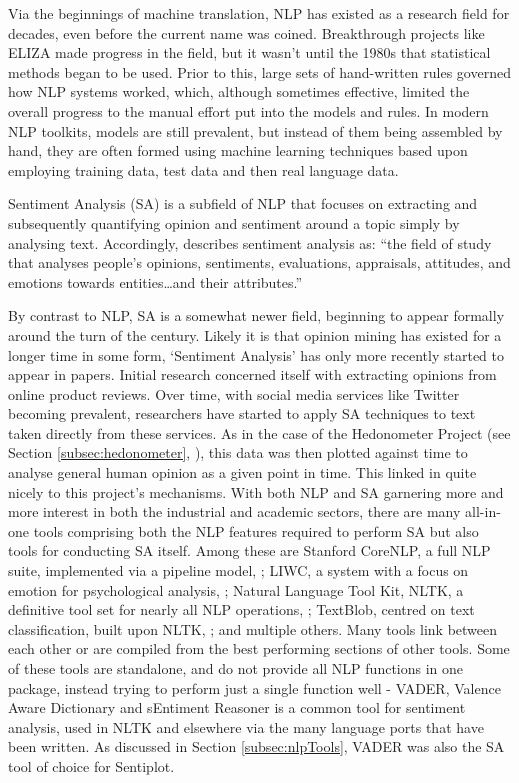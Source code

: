 \documentclass{article}
\begin{document}
{        Via the beginnings of machine translation, NLP has existed as a research field for decades, even before the current name was coined. Breakthrough projects like ELIZA \citep{eliza} made progress in the field, but it wasn't until the 1980s that statistical methods began to be used. Prior to this, large sets of hand-written rules governed how NLP systems worked, which, although sometimes effective, limited the overall progress to the manual effort put into the models and rules. In modern NLP toolkits, models are still prevalent, but instead of them being assembled by hand, they are often formed using machine learning techniques based upon employing training data, test data and then real language data.

        Sentiment Analysis (SA) is a subfield of NLP that focuses on extracting and subsequently quantifying opinion and sentiment around a topic simply by analysing text. Accordingly, \cite{liu2012sentiment} describes sentiment analysis as: ``the field of study that analyses people’s opinions, sentiments, evaluations, appraisals, attitudes, and emotions towards entities\dots and their attributes.''
        
        By contrast to NLP, SA is a somewhat newer field, beginning to appear formally around the turn of the century. Likely it is that opinion mining has existed for a longer time in some form, `Sentiment Analysis' has only more recently started to appear in papers. Initial research concerned itself with extracting opinions from online product reviews. Over time, with social media services like Twitter becoming prevalent, researchers have started to apply SA techniques to text taken directly from these services. As in the case of the Hedonometer Project (see Section \ref{subsec:hedonometer}, \cite{reagan2016emotional}), this data was then plotted against time to analyse general human opinion as a given point in time. This linked in quite nicely to this project's mechanisms.
        With both NLP and SA garnering more and more interest in both the industrial and academic sectors, there are many all-in-one tools comprising both the NLP features required to perform SA but also tools for conducting SA itself. Among these are Stanford CoreNLP, a full NLP suite, implemented via a pipeline model, \citep{stanfordNLP}; LIWC, a system with a focus on emotion for psychological analysis, \citep{tausczik2010psychological}; Natural Language Tool Kit, NLTK, a definitive tool set for nearly all NLP operations, \citep{loper2002nltk}; TextBlob, centred on text classification, built upon NLTK, \citep{textblob}; and multiple others. Many tools link between each other or are compiled from the best performing sections of other tools. Some of these tools are standalone, and do not provide all NLP functions in one package, instead trying to perform just a single function well - VADER, Valence Aware Dictionary and sEntiment Reasoner \citep{hutto2014vader} is a common tool for sentiment analysis, used in NLTK and elsewhere via the many language ports that have been written. As discussed in Section \ref{subsec:nlpTools}, VADER was also the SA tool of choice for Sentiplot.

}
\end{document}
